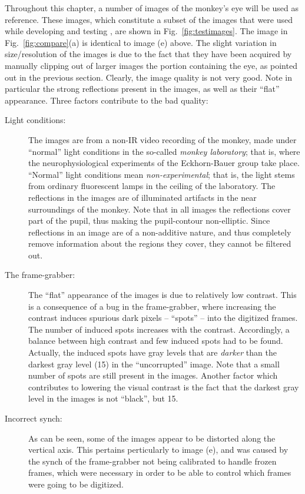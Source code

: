 \noindent Throughout this chapter, a number of images of the monkey's
eye will be used as reference.  These images, which constitute a
subset of the images that were used while developing and testing
{\octopus}, are shown in Fig.~\ref{fig:testimages}.  The image in
Fig.~\ref{fig:compare}(a) is identical to image (e) above.  The slight
variation in size/resolution of the images is due to the fact that
they have been acquired by manually clipping out of larger images the
portion containing the eye, as pointed out in the previous section.
Clearly, the image quality is not very good.  Note in particular the
strong reflections present in the images, as well as their ``flat''
appearance.  Three factors contribute to the bad quality:
\begin{description}
\item[Light conditions:] The images are from a non-IR video recording
  of the monkey, made under ``normal'' light conditions in the
  so-called {\em monkey laboratory\/}; that is, where the
  neurophysiological experiments of the Eckhorn-Bauer group take
  place.  ``Normal'' light conditions mean {\em non-experimental\/};
  that is, the light stems from ordinary fluorescent lamps in the
  ceiling of the laboratory.  The reflections in the images are of
  illuminated artifacts in the near surroundings of the monkey.  Note
  that in all images the reflections cover part of the pupil, thus
  making the pupil-contour non-elliptic.  Since reflections in an
  image are of a non-additive nature, and thus completely remove
  information about the regions they cover, they cannot be filtered
  out.
\item[The frame-grabber:] The ``flat'' appearance of the images is due
  to relatively low contrast.  This is a consequence of a bug in the
  frame-grabber, where increasing the contrast induces spurious dark
  pixels -- ``spots'' -- into the digitized frames.  The number of
  induced spots increases with the contrast.  Accordingly, a balance
  between high contrast and few induced spots had to be found.
  Actually, the induced spots have gray levels that are {\em darker\/}
  than the darkest gray level (15) in the ``uncorrupted'' image.  Note
  that a small number of spots are still present in the images.
  Another factor which contributes to lowering the visual contrast is
  the fact that the darkest gray level in the images is not ``black'',
  but 15.
\item[Incorrect synch:] As can be seen, some of the images appear to
  be distorted along the vertical axis.  This pertains perticularly to
  image (e), and was caused by the synch of the frame-grabber not
  being calibrated to handle frozen frames, which were necessary in
  order to be able to control which frames were going to be digitized.
\end{description}

